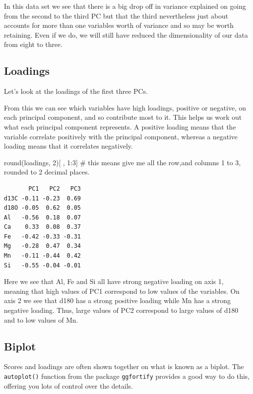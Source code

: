 \documentclass[
  letterpaper,
  DIV=11,
  numbers=noendperiod]{scrreprt}
\newenvironment{Shaded}{\begin{snugshade}}{\end{snugshade}}
\newcommand{\CommentTok}[1]{\textcolor[rgb]{0.37,0.37,0.37}{#1}}
\newcommand{\DecValTok}[1]{\textcolor[rgb]{0.68,0.00,0.00}{#1}}
\newcommand{\FunctionTok}[1]{\textcolor[rgb]{0.28,0.35,0.67}{#1}}
\newcommand{\NormalTok}[1]{\textcolor[rgb]{0.00,0.23,0.31}{#1}}
\newcommand{\SpecialCharTok}[1]{\textcolor[rgb]{0.37,0.37,0.37}{#1}}
\begin{document}
In this data set we see that there is a big drop off in variance
explained on going from the second to the third PC but that the third
nevertheless just about accounts for more than one variables worth of
variance and so may be worth retaining. Even if we do, we will still
have reduced the dimensionality of our data from eight to three.

\subsection{Loadings}\label{loadings}

Let's look at the loadings of the first three PCs.

From this we can see which variables have high loadings, positive or
negative, on each principal component, and so contribute most to it.
This helps us work out what each principal component represents. A
positive loading means that the variable correlate positively with the
principal component, whereas a negative loading means that it correlates
negatively.

\begin{Shaded}
\begin{Highlighting}[]
\FunctionTok{round}\NormalTok{(loadings, }\DecValTok{2}\NormalTok{)[ , }\DecValTok{1}\SpecialCharTok{:}\DecValTok{3}\NormalTok{] }\CommentTok{\# this means give me all the row,and columns 1 to 3, rounded to 2 decimal places.}
\end{Highlighting}
\end{Shaded}

\begin{verbatim}
       PC1   PC2   PC3
d13C -0.11 -0.23  0.69
d18O -0.05  0.62  0.05
Al   -0.56  0.18  0.07
Ca    0.33  0.08  0.37
Fe   -0.42 -0.33 -0.31
Mg   -0.28  0.47  0.34
Mn   -0.11 -0.44  0.42
Si   -0.55 -0.04 -0.01
\end{verbatim}

Here we see that Al, Fe and Si all have strong negative loading on axis
1, meaning that high values of PC1 correspond to low values of the
variables. On axis 2 we see that d180 has a strong positive loading
while Mn has a strong negative loading. Thus, large values of PC2
correspond to large values of d180 and to low values of Mn.

\subsection{Biplot}\label{biplot}

Scores and loadings are often shown together on what is known as a
biplot. The \texttt{autoplot()} function from the package
\texttt{ggfortify} provides a good way to do this, offering you lots of
control over the details.
\end{document}
